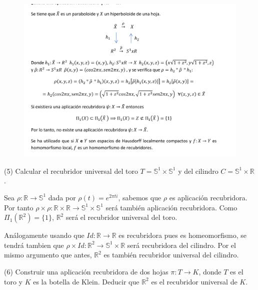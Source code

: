 \documentclass[
  a4paper,
  spanish,
  12pt,
]{scrartcl}
\begin{document}
\begin{figure}[h]
    \centering
    \includegraphics[width=\textwidth]{ej4.png}
    \label{fig:etiqueta}
\end{figure}


\begin{ejer}
(5) Calcular el recubridor universal del toro $T=\mathbb{S}^{1} \times \mathbb{S}^{1}$ y del cilindro $C=\mathbb{S}^{1} \times \mathbb{R}$.\\
\end{ejer}

\begin{sol}
Sea $\rho: \mathbb{R} \rightarrow \mathbb{S}^1$ dada por $\rho(t) = e^{2\pi t i}$, sabemos que 
$\rho$ es aplicación recubridora. Por tanto $\rho \times \rho: \mathbb{R} \times \mathbb{R} \rightarrow \mathbb{S}^1 \times \mathbb{S}^1$ será
también aplicación recubridora. Como $\Pi_1(\mathbb{R}^2) = \{1\}$, $\mathbb{R}^2$ será el recubridor universal del toro.

Análogamente usando que $Id: \mathbb{R} \rightarrow \mathbb{R}$ es recubridora pues es homeomorfismo, se tendrá tambien que
$\rho \times Id: \mathbb{R}^2 \rightarrow \mathbb{S}^1 \times \mathbb{R}$ será recubridora del cilindro.
Por el mismo argumento que antes, $\mathbb{R}^2$ es también recubridor universal del cilindro.
\end{sol}

\begin{ejer}
(6) Construir una aplicación recubridora de dos hojas $\pi: T \rightarrow K$, donde $T$ es el toro y $K$ es la botella de Klein. Deducir que $\mathbb{R}^{2}$ es el recubridor universal de $K$.\\
\end{ejer}
\end{document}
